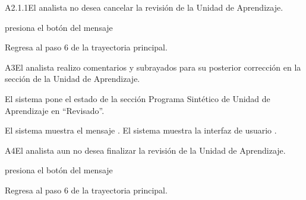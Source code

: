 \begin{UCtrayectoriaA}{A2.1.1}{El analista no desea cancelar la revisión de la Unidad de Aprendizaje.} 

	\hypertarget{SP2-CU5-A2.1.1}{\UCpaso[\UCactor] presiona el botón  del mensaje }
    \UCpaso Regresa al paso 6 de la trayectoria principal. 
\end{UCtrayectoriaA}

	
\begin{UCtrayectoriaA}{A3}{El analista realizo comentarios y subrayados para su posterior corrección en la sección de la Unidad de Aprendizaje.} 

	\hypertarget{SP2-CU5-A3}{\UCpaso El sistema pone el estado de la sección Programa Sintético de Unidad de Aprendizaje en “Revisado”.}
    \UCpaso El sistema muestra el mensaje .
    \UCpaso El sistema muestra la interfaz de usuario .
\end{UCtrayectoriaA}

	
\begin{UCtrayectoriaA}{A4}{El analista aun no desea finalizar la revisión de la Unidad de Aprendizaje.} 

	\hypertarget{SP2-CU5-A4}{\UCpaso[\UCactor] presiona el botón  del mensaje }
    \UCpaso Regresa al paso 6 de la trayectoria principal. 
\end{UCtrayectoriaA}